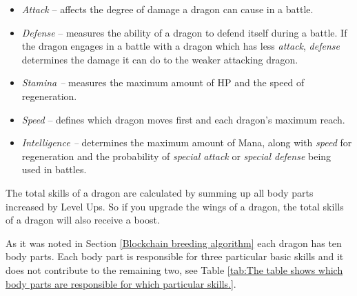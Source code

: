\documentclass[12pt]{article}
\begin{document}
\begin{itemize}
	\item \textit{Attack} -- affects the degree of damage a dragon can cause in a battle.\par

	\item \textit{Defense} -- measures the ability of a dragon to defend itself during a battle. If the dragon engages in a battle with a dragon which has less \textit{attack}, \textit{defense} determines the damage it can do to the weaker attacking dragon.\par

	\item \textit{Stamina -- }measures the maximum amount of HP and the speed of regeneration.\par

	\item \textit{Speed} -- defines which dragon moves first and each dragon’s maximum reach.\par

	\item \textit{Intelligence -- }determines the maximum amount of Mana, along with \textit{speed} for regeneration and the probability of \textit{special attack} or \textit{special defense} being used in battles.
\end{itemize}\par

The total skills of a dragon are calculated by summing up all body parts increased by Level Ups. So if you upgrade the wings of a dragon, the total skills of a dragon will also receive a boost.\par

As it was noted in Section \ref{Blockchain breeding algorithm} each dragon has ten body parts. Each body part is responsible for three particular basic skills and it does not contribute to the remaining two, see  Table \ref{tab:The table shows which body parts are responsible for which particular skills.}.\par




\end{document}
